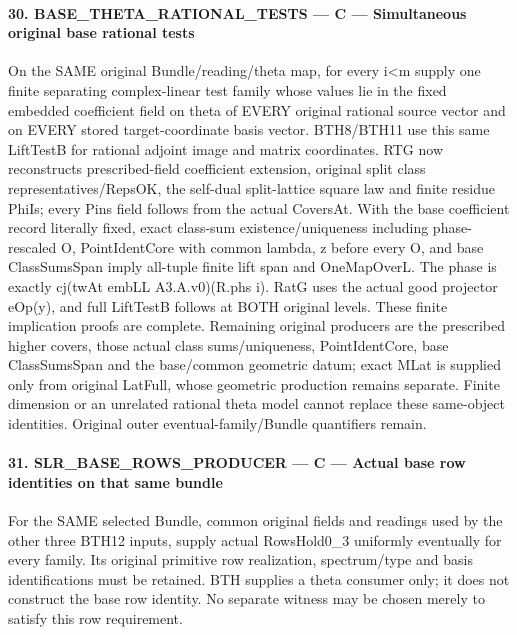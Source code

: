\paragraph{30. BASE\_\allowbreak{}THETA\_\allowbreak{}RATIONAL\_\allowbreak{}TESTS — C — Simultaneous original base rational tests}

On the SAME original Bundle/\allowbreak{}reading/\allowbreak{}theta map, for every i<m supply one finite separating complex-linear test family whose values lie in the fixed embedded coefficient field on theta of EVERY original rational source vector and on EVERY stored target-coordinate basis vector. BTH8/\allowbreak{}BTH11 use this same LiftTestB for rational adjoint image and matrix coordinates. RTG now reconstructs prescribed-field coefficient extension, original split class representatives/\allowbreak{}RepsOK, the self-dual split-lattice square law and finite residue PhiIs; every Pins field follows from the actual CoversAt. With the base coefficient record literally fixed, exact class-sum existence/\allowbreak{}uniqueness including phase-rescaled O, PointIdentCore with common lambda,\allowbreak{} z before every O, and base ClassSumsSpan imply all-tuple finite lift span and OneMapOverL. The phase is exactly cj(twAt embLL A3.A.v0)(R.phs i). RatG uses the actual good projector eOp(y), and full LiftTestB follows at BOTH original levels. These finite implication proofs are complete. Remaining original producers are the prescribed higher covers, those actual class sums/\allowbreak{}uniqueness, PointIdentCore, base ClassSumsSpan and the base/\allowbreak{}common geometric datum; exact MLat is supplied only from original LatFull, whose geometric production remains separate. Finite dimension or an unrelated rational theta model cannot replace these same-object identities. Original outer eventual-family/\allowbreak{}Bundle quantifiers remain.


\paragraph{31. SLR\_\allowbreak{}BASE\_\allowbreak{}ROWS\_\allowbreak{}PRODUCER — C — Actual base row identities on that same bundle}

For the SAME selected Bundle, common original fields and readings used by the other three BTH12 inputs, supply actual RowsHold0\_\allowbreak{}3 uniformly eventually for every family. Its original primitive row realization, spectrum/\allowbreak{}type and basis identifications must be retained. BTH supplies a theta consumer only; it does not construct the base row identity. No separate witness may be chosen merely to satisfy this row requirement.

